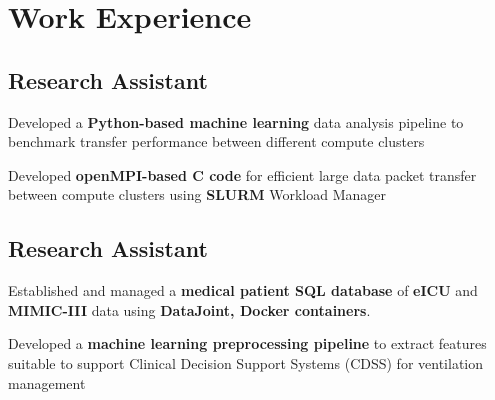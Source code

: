 \documentclass[letterpaper]{deedy-resume} %
\begin{document}
%
\begin{minipage}[t]{0.62\textwidth} %


\section{Work Experience}

\subsection{Research Assistant}
\vspace{-0.5\topsep} \hfill {}
\vspace{1\topsep}
\begin{tightitemize} %
    \item Developed a {\bf Python-based machine learning} data analysis pipeline to benchmark transfer performance between different compute clusters
    \item Developed {\bf openMPI-based C code} for efficient large data packet transfer between compute clusters using {\bf SLURM} Workload Manager
\end{tightitemize} %



\sectionspace
\subsection{Research Assistant}
\hfill {}
\vspace{-0.2\topsep}
\begin{tightitemize}
    \item Established and managed a {\bf medical patient SQL database} of {\bf eICU} and {\bf MIMIC-III} data using {\bf DataJoint, Docker containers}.
    \item Developed a {\bf machine learning preprocessing pipeline} to extract features suitable to support Clinical Decision Support Systems (CDSS) for ventilation management
\end{tightitemize}


\sectionspace

\end{minipage}
\end{document}
